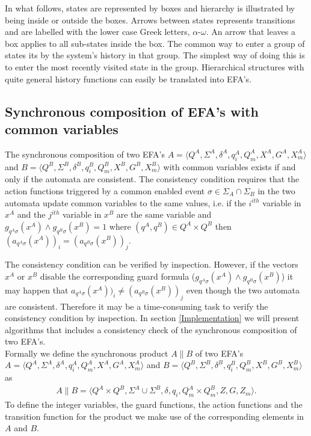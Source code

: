 \documentclass{article}
\begin{document}
In what follows, states are represented by boxes and hierarchy is
illustrated by being inside or outside the boxes. Arrows between
states represents transitions and are labelled with the lower case
Greek letters, $\alpha$-$\omega$. An arrow that leaves a box
applies to all sub-states inside the box. The common way to enter
a group of states its by the system's history in that group. The
simplest way of doing this is to enter the most recently visited
state in the group. Hierarchical structures with quite general
history functions can easily be translated into EFA's.




\subsection{Synchronous composition of EFA's with common variables}

The synchronous composition of two EFA's $A=\langle Q^A, \Sigma^A,
\delta^A, q^A_i, Q^A_m, X^{A}, G^A, X^A_m \rangle$ and $B=\langle
Q^B, \Sigma^B, \delta^B, q^B_i, Q^B_m, X^{B}, G^B, X^B_m \rangle$
with common variables exists if and only if the automata are
consistent. The consistency condition requires that the action
functions triggered by a common enabled event $\sigma\in
\Sigma_{A}\cap \Sigma_{B}$ in the two automata update common
variables to the same values, i.e. if the $i^{ith}$ variable in
$x^{A}$ and the $j^{ith}$ variable in $x^{B}$ are the same
variable and $g_{q^A \sigma}(x^{A})\wedge g_{q^B \sigma}(x^{B})=1$
where $(q^A,q^B)\in Q^A\times Q^B$ then $(a_{q^A \sigma}(x^{A}))_i
= (a_{q^B \sigma}(x^{B}))_j$.

The consistency condition can be verified by inspection. However,
if the vectors $x^{A}$ or $x^{B}$ disable the corresponding guard
formula ($g_{q^A \sigma}(x^{A})\wedge g_{q^B \sigma}(x^{B})$) it
may happen that $a_{q^A \sigma}(x^{A}))_i \neq (a_{q^B
\sigma}(x^{B}))_j$ even though the two automata are consistent.
Therefore it may be a time-consuming task to verify the
consistency condition by inspection. In section
\ref{Implementation} we will present algorithms that includes a
consistency check of the synchronous
composition of two EFA's. \\

Formally we define the synchronous product $A\|B$ of two EFA's
$A=\langle Q^A, \Sigma^A, \delta^A, q^A_i, Q^A_m, X^{A}, G^A,X^A_m
\rangle$ and $B=\langle Q^B, \Sigma^B, \delta^B, q^B_i, Q^B_m,
X^{B}, G^B,X^B_m
 \rangle$ as
\begin{eqnarray}
A\|B=\langle Q^A\times Q^B, \Sigma^A \cup \Sigma^B , \delta, q_i,
Q^A_m\times Q^B_m, Z, G, Z_m \rangle.
\end{eqnarray}
To define the integer variables, the guard functions, the action
functions and the transition function for the product we make use
of the corresponding elements in $A$ and $B$.
\end{document}
